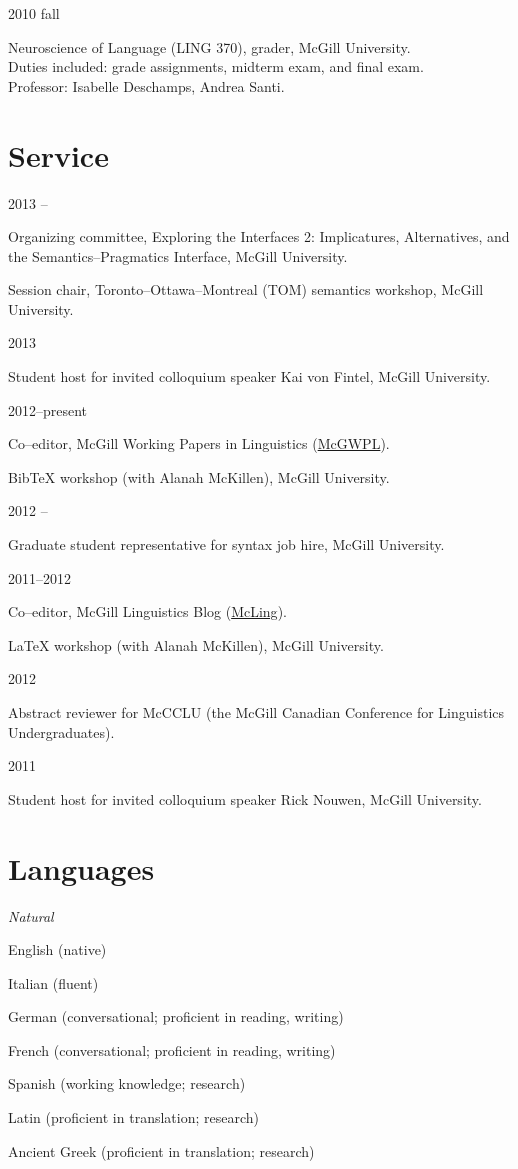 \documentclass[11pt,letterpaper]{article}
\newcommand{\cvitem}[2]{%
  \begin{minipage}[t]{0.24\textwidth}
    #1 %
  \end{minipage}
  \hfill
  \begin{minipage}[t]{0.74\textwidth}
    #2 %
  \end{minipage}
}
\renewenvironment{itemize}{%
  \begin{list}{}{%
    \setlength{\itemsep}{0.5em}
    \setlength{\leftmargin}{0em}
  }
}{%
  \end{list}
}
\newcommand{\tadetails}[2]{%
  {\footnotesize Duties included: #1. \\ Professor: #2.}
}
\begin{document}
\cvitem{2010 fall}{Neuroscience of Language (LING 370), grader, McGill
  University. \\ \tadetails{grade assignments, midterm exam, and final
  exam}{Isabelle Deschamps, Andrea Santi}}



\section*{Service}

\cvitem{2013 \shortmonthname[4]--\shortmonthname[5]}{Organizing committee,
Exploring the Interfaces 2: Implicatures, Alternatives, and the
Semantics--Pragmatics Interface, McGill University.}

\cvitem{}{Session chair, Toronto--Ottawa--Montreal
(TOM) semantics workshop, McGill University.}

\cvitem{2013 \shortmonthname[1]}{Student host for invited colloquium speaker
Kai von Fintel, McGill University.}

\cvitem{2012--present}{Co--editor, McGill Working Papers in Linguistics
(\href{http://www.mcgill.ca/mcgwpl/}{McGWPL}).}

\cvitem{}{Bib\TeX{} workshop (with Alanah McKillen),
McGill University.}

\cvitem{2012 \shortmonthname[5]--\shortmonthname[6]}{Graduate student
representative for syntax job hire, McGill University.}

\cvitem{2011--2012}{Co--editor, McGill Linguistics Blog
(\href{https://blogs.mcgill.ca/mcling/}{McLing}).}

\cvitem{}{\LaTeX{} workshop (with Alanah McKillen),
McGill University.}

\cvitem{2012 \shortmonthname[1]}{Abstract reviewer for McCCLU (the McGill
Canadian Conference for Linguistics Undergraduates).}

\cvitem{2011 \shortmonthname[12]}{Student host for invited colloquium speaker
Rick Nouwen, McGill University.}



\section*{Languages}

\cvitem{\textit{Natural}}{%
  \begin{itemize}
    \item English \hfill (native)
    \item Italian \hfill (fluent)
    \item German \hfill (conversational; proficient in reading, writing)
    \item French \hfill (conversational; proficient in reading, writing)
    \item Spanish \hfill (working knowledge; research)
    \item Latin \hfill (proficient in translation; research)
    \item Ancient Greek \hfill (proficient in translation; research)
  \end{itemize}
}
\end{document}
